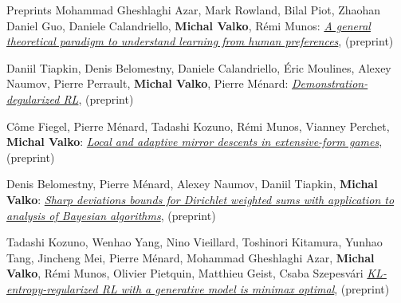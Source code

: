 \documentclass{resume}
\begin{document}
\begin{category}{Preprints}
\citembullet
Mohammad Gheshlaghi Azar, Mark Rowland, Bilal Piot, Zhaohan Daniel Guo, Daniele Calandriello,  {\bf Michal Valko},  R\' emi Munos:
\href{https://arxiv.org/pdf/2310.17303}{\emph{A general theoretical paradigm to understand learning from human preferences}},
({\sf preprint}) 

\citembullet
Daniil Tiapkin, Denis Belomestny, Daniele Calandriello, \' Eric Moulines, Alexey Naumov,  Pierre Perrault, {\bf Michal Valko}, Pierre M\' enard: 
\href{https://arxiv.org/pdf/2310.12036}{\emph{Demonstration-degularized RL}},
({\sf preprint}) 


\citembullet
C\^ome  Fiegel, Pierre Ménard, Tadashi Kozuno, R\' emi Munos, Vianney Perchet,  {\bf Michal Valko}:
\href{https://arxiv.org/pdf/2309.00656.pdf}{\emph{Local and adaptive mirror descents in extensive-form games}},
({\sf preprint}) 



\citembullet
Denis Belomestny, Pierre Ménard, Alexey Naumov, Daniil Tiapkin,  {\bf Michal Valko}:
\href{https://arxiv.org/pdf/2304.03056.pdf}{\emph{Sharp deviations bounds for Dirichlet weighted sums with application to analysis of Bayesian algorithms}},
({\sf preprint}) 


\citembullet
Tadashi Kozuno, Wenhao Yang, Nino Vieillard, Toshinori Kitamura, Yunhao Tang, Jincheng Mei, Pierre M\' enard, Mohammad Gheshlaghi Azar, {\bf Michal Valko}, R\' emi Munos, Olivier Pietquin, Matthieu Geist, Csaba Szepesv\' ari
\href{https://arxiv.org/pdf/2205.14211.pdf}{\emph{KL-entropy-regularized RL with a generative model is minimax optimal}},
({\sf preprint}) 
\end{category}
\end{document}
